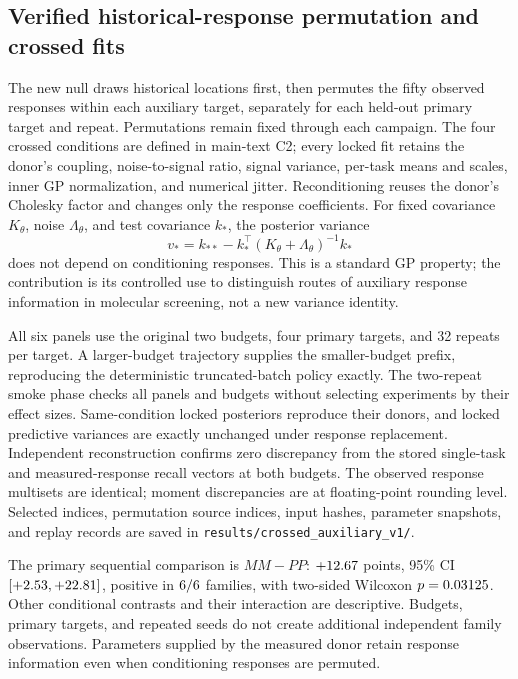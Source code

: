 \documentclass[10pt]{article}
\begin{document}
\subsection{Verified historical-response permutation and crossed fits}
\label{app:crossed}

The new null draws historical locations first, then permutes the fifty
observed responses within each auxiliary target, separately for each held-out
primary target and repeat. Permutations remain fixed through each campaign.
The four crossed conditions are defined in main-text C2; every locked fit
retains the donor's coupling, noise-to-signal ratio, signal variance, per-task
means and scales, inner GP normalization, and numerical jitter. Reconditioning
reuses the donor's Cholesky factor and changes only the response coefficients.
For fixed covariance $K_\theta$, noise $\Lambda_\theta$, and test covariance
$k_*$, the posterior variance
\[
v_*=k_{**}-k_*^\top(K_\theta+\Lambda_\theta)^{-1}k_*
\]
does not depend on conditioning responses. This is a standard GP property;
the contribution is its controlled use to distinguish routes of auxiliary
response information in molecular screening, not a new variance identity.

All six panels use the original two budgets, four primary targets, and
32 repeats per target. A larger-budget trajectory supplies the smaller-budget
prefix, reproducing the deterministic truncated-batch policy exactly.
The two-repeat smoke phase checks all panels and budgets without selecting
experiments by their effect sizes. Same-condition locked posteriors reproduce
their donors, and locked predictive variances are exactly unchanged under
response replacement. Independent reconstruction confirms zero discrepancy
from the stored single-task and measured-response recall vectors at both
budgets. The observed response multisets are identical; moment discrepancies
are at floating-point rounding level. Selected indices, permutation source
indices, input hashes, parameter snapshots, and replay records are saved in
\texttt{results/crossed\_auxiliary\_v1/}.

The primary sequential comparison is $MM-PP$: $+12.67{}$ points,
95\% CI $[+2.53,+22.81]{}$, positive in $6{}/6$
families, with two-sided Wilcoxon $p=0.03125{}$.
Other conditional contrasts and their interaction are descriptive. Budgets,
primary targets, and repeated seeds do not create additional independent
family observations. Parameters supplied by the measured donor retain
response information even when conditioning responses are permuted.
\end{document}
